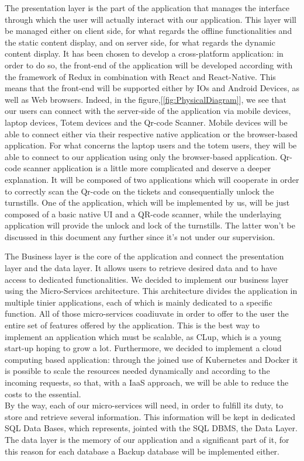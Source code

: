 The presentation layer is the part of the application that manages the interface through which the user will actually interact with our application. 
This layer will be managed either on client side, for what regards the offline functionalities and the static content display, and on server side, for what regards the dynamic content display. 
It has been chosen to develop a cross-platform application: in order to do so, the front-end of the application will be developed according with the framework of Redux in combination with React and React-Native.
This means that the front-end will be supported either by IOs and Android Devices, as well as Web browsers.
Indeed, in the figure,[\ref{fig:PhysicalDiagram}], we see that our users can connect with the server-side of the application via mobile devices, laptop devices, Totem devices and the Qr-code Scanner.
Mobile devices will be able to connect either via their respective native application or the browser-based application.
For what concerns the laptop users and the totem users, they will be able to connect to our application using only the browser-based application.
Qr-code scanner application is a little more complicated and deserve a deeper explanation. It will be composed of two applications which will cooperate in order to correctly scan the Qr-code on the tickets and consequentially unlock the turnstills. One of the application, which will be implemented by us, will be just composed of a basic native UI and a QR-code scanner, while the underlaying application will provide the unlock and lock of the turnstills.
The latter won't be discussed in this document any further since it's not under our supervision.

The Business layer is the core of the application and connect the presentation layer and the data layer. It allows users to retrieve desired data and to have access to dedicated functionalities. We decided to implement our business layer using the Micro-Services architecture. This architecture divides the application in multiple tinier applications, each of which is mainly dedicated to a specific function. All of those micro-services coadiuvate in order to offer to the user the entire set of features offered by the application. This is the best way to implement an application which must be scalable, as CLup, which is a young start-up hoping to grow a lot. Furthermore, we decided to implement a cloud computing based application: through the joined use of Kubernetes and Docker it is possible to scale the resources needed dynamically and according to the incoming requests, so that, with a IaaS approach, we will be able to reduce the costs to the essential.\\
By the way, each of our micro-services will need, in order to fulfill its duty, to store and retrieve several information. This information will be kept in dedicated SQL Data Bases, which represents, jointed with the SQL DBMS, the Data Layer. The data layer is the memory of our application and a significant part of it, for this reason for each database a Backup database will be implemented either.\\


